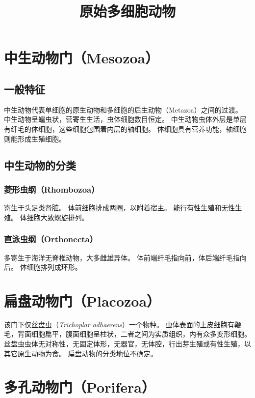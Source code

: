 \documentclass[11pt]{article}
\title{原始多细胞动物}
\date{}
\begin{document}
  \maketitle

  \linenumbers

\section{中生动物门（Mesozoa）}
\subsection{一般特征}
中生动物代表单细胞的原生动物和多细胞的后生动物（Metazoa）之间的过渡。
中生动物呈蠕虫状，营寄生生活，虫体细胞数目恒定。
中生动物虫体外层是单层有纤毛的体细胞，这些细胞包围着内层的轴细胞。
体细胞具有营养功能，轴细胞则能形成生殖细胞。

\subsection{中生动物的分类}
\subsubsection{菱形虫纲（Rhombozoa）}
寄生于头足类肾脏。
体前细胞排成两圈，以附着宿主。
能行有性生殖和无性生殖。
体细胞大致螺旋排列。

\subsubsection{直泳虫纲（Orthonecta）}
多寄生于海洋无脊椎动物，大多雌雄异体。
体前端纤毛指向前，体后端纤毛指向后。
体细胞排列成环形。

\section{扁盘动物门（Placozoa）}
该门下仅丝盘虫（\textit{Trichoplar adhaerens}）一个物种。
虫体表面的上皮细胞有鞭毛，背面细胞扁平，腹面细胞呈柱状，二者之间为实质组织，内有众多变形细胞。
丝盘虫虫体无对称性，无固定体形，无器官，无体腔，行出芽生殖或有性生殖，以其它原生动物为食。
扁盘动物的分类地位不确定。
  
\section{多孔动物门（Porifera）}
\end{document}
